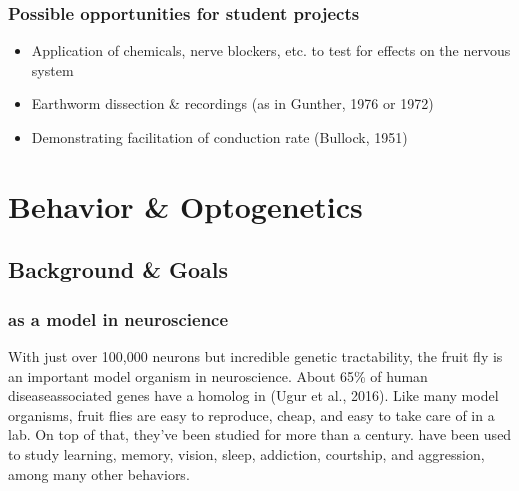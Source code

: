 \documentclass[letterpaper,10pt,english]{jupyterBook}
\begin{document}
\subsection{Possible opportunities for student projects}
\label{\detokenize{Earthworm:possible-opportunities-for-student-projects}}\begin{itemize}
\item {} 
\sphinxAtStartPar
Application of chemicals, nerve blockers, etc. to test for effects on the nervous system

\item {} 
\sphinxAtStartPar
Earthworm dissection \& recordings (as in Gunther, 1976 or 1972)

\item {} 
\sphinxAtStartPar
Demonstrating facilitation of conduction rate (Bullock, 1951)

\end{itemize}

\sphinxstepscope


\chapter{ Behavior \& Optogenetics}
\label{\detokenize{Drosophila/Introduction:drosophila-behavior-optogenetics}}\label{\detokenize{Drosophila/Introduction::doc}}

\section{Background \& Goals}
\label{\detokenize{Drosophila/Introduction:background-goals}}

\subsection{ as a model in neuroscience}
\label{\detokenize{Drosophila/Introduction:drosophila-as-a-model-in-neuroscience}}
\sphinxAtStartPar
With just over 100,000 neurons but incredible genetic tractability, the fruit fly is an important model organism in neuroscience. About 65\% of human disease\sphinxhyphen{}associated genes have a homolog in  (Ugur et al., 2016). Like many model organisms, fruit flies are easy to reproduce, cheap, and easy to take care of in a lab. On top of that, they’ve been studied for more than a century.  have been used to study learning, memory, vision, sleep, addiction, courtship, and aggression, among many other behaviors.
\end{document}
